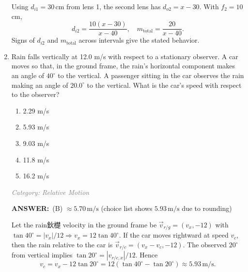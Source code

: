 ﻿\documentclass[12pt, a4paper]{article}
\makeatletter
\newcommand{\finalanswer}[1]{\textbf{ANSWER:}~#1}
\newif\if@categoryprinted
\newcommand{\category}[1]{\if@categoryprinted\relax\else\textit{\textcolor{gray}{Category: #1}}\global\@categoryprintedtrue\fi}
\makeatother
\begin{document}
\begin{CJK*}{UTF8}{gbsn}
\begin{enumerate}[itemsep=1.0em, topsep=0.6em]
\begin{solutionbox}
Using $d_{i1}=30\,\text{cm}$ from lens 1, the second lens has $d_{o2}=x-30$. With $f_2=10$ cm,
\[ d_{i2}=\frac{10(x-30)}{x-40}, \quad m_{\text{total}}=\frac{20}{x-40}. \]
Signs of $d_{i2}$ and $m_{\text{total}}$ across intervals give the stated behavior.
\end{solutionbox}

\item \label{prob:26}
Rain falls vertically at 12.0 m/s with respect to a stationary observer. A car moves so that, in the ground frame, the rain's horizontal component makes an angle of $40^\circ$ to the vertical. A passenger sitting in the car observes the rain making an angle of $20.0^\circ$ to the vertical. What is the car's speed with respect to the observer?
\begin{enumerate}[label=(\Alph*)]
    \item 2.29 m/s
    \item 5.93 m/s
    \item 9.03 m/s
    \item 11.8 m/s
    \item 16.2 m/s
\end{enumerate}

\category{Relative Motion}
\begin{answerbox}
\finalanswer{(B) $\approx 5.70\,\text{m/s}$ (choice list shows $5.93\,\text{m/s}$ due to rounding)}
\end{answerbox}
\begin{solutionbox}

Let the rain鈥檚 velocity in the ground frame be $\vec v_{r/g}=(v_x,-12)$ with $\tan 40^\circ=|v_x|/12 \Rightarrow v_x=12\tan 40^\circ$. If the car moves rightward at speed $v_c$, then the rain relative to the car is $\vec v_{r/c}=(v_x-v_c,-12)$. The observed $20^\circ$ from vertical implies $\tan 20^\circ=|v_{r/c,x}|/12$. Hence
\[
v_c=v_x-12\tan 20^\circ=12(\tan 40^\circ-\tan 20^\circ)\approx5.93\,\text{m/s}.
\]
\end{solutionbox}

\newpage


\end{enumerate}
\end{CJK*}
\end{document}
